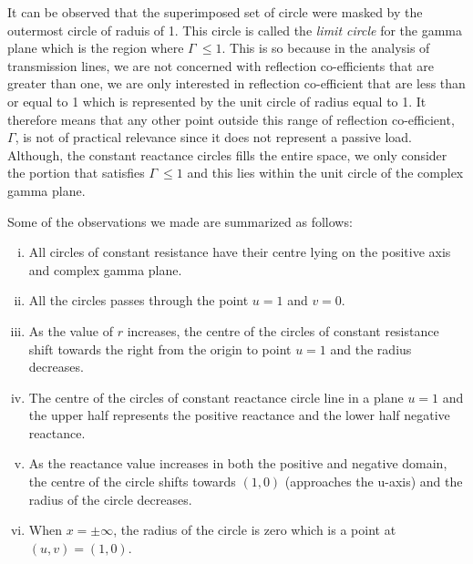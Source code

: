 It can be observed that the superimposed set of circle were masked by the outermost circle of raduis of 1. This circle is called the \emph{limit circle} for the gamma plane which is the region where $\Gamma\ \leq 1$. This is so because in the analysis of transmission lines, we are not concerned with reflection co-efficients that are greater than one, we are only interested in reflection co-efficient that are less than or equal to 1 which is represented by the unit circle of radius equal to 1. It therefore means that any other point outside this range of reflection co-efficient, $\Gamma$, is not of practical relevance since it does not represent a passive load.  Although, the constant reactance circles fills the entire space, we only consider the portion that satisfies $ \Gamma\ \leq 1$ and this lies within the unit circle of the complex gamma plane.

Some of the observations we made are summarized as follows:
\begin{enumerate}[(i)]
\item All circles of constant resistance have their centre lying on the positive axis and complex gamma plane.
\item All the circles passes through the point $u = 1$ and $v = 0$.
\item As the value of $r$ increases, the centre of the circles of constant resistance shift towards the right from the origin to point $u = 1$ and the radius decreases.
\item The centre of the circles of constant reactance circle line in a plane $u = 1$ and the upper half represents the positive reactance and the lower half negative reactance.
\item As the reactance value increases in both the positive and negative domain, the centre of the circle shifts towards $(1, 0)$ (approaches the u-axis) and the radius of the circle decreases.
\item When $x = \pm\infty$, the radius of the circle is zero which is a point at $(u,v) = (1,0)$.
\end{enumerate}

